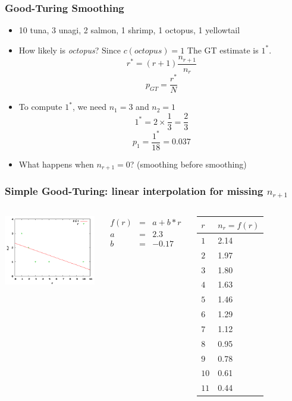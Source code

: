 \begin{frame}
\frametitle{Good-Turing Smoothing}
\begin{itemize}[<+->]
\item { \color{blue} 10} tuna,  { \color{blue} 3} unagi,  { \color{blue} 2} salmon,  { \color{blue} 1} shrimp,  { \color{blue} 1} octopus,  { \color{blue} 1} yellowtail
\item How likely is {\em octopus}? Since $c(\textit{octopus}) = 1$ The GT estimate is $1^\ast$. 
{\color{blue} \[ r^\ast = (r+1) \frac{ n_{r+1} }{ n_r } \] }
{\color{blue} \[ p_{GT} = \frac{ r^\ast }{ N } \] }
\item To compute $1^\ast$, we need $n_1 = 3$ and $n_2 = 1$
\[ 1^\ast = 2 \times \frac{1}{3} = \frac{2}{3} \]
\[ p_1 = \frac{1^\ast}{18} = 0.037 \]
\item What happens when $n_{r+1} = 0$? (smoothing before smoothing)
\end{itemize}
\end{frame}

\begin{frame}
\frametitle{Simple Good-Turing: linear interpolation for missing $n_{r+1}$}
\begin{columns}[l]
\includegraphics[scale=0.55]{figures/fit.png}
{\small
\begin{eqnarray*}
f(r) & = & a + b * r \\
a & = & 2.3 \\
b & = & -0.17 
\end{eqnarray*}
\begin{tabular}{ll}
\hline
$r$ & $n_r = f(r)$  \\
\hline
$1$ & 2.14 \\
$2$ & 1.97 \\
$3$ & 1.80 \\
$4$ & 1.63 \\
$5$ & 1.46 \\
$6$ & 1.29 \\
$7$ & 1.12 \\
$8$ & 0.95 \\
$9$ & 0.78 \\
$10$ & 0.61 \\
$11$ & 0.44 \\
\hline
\end{tabular}
}
\end{columns}
\end{frame}


